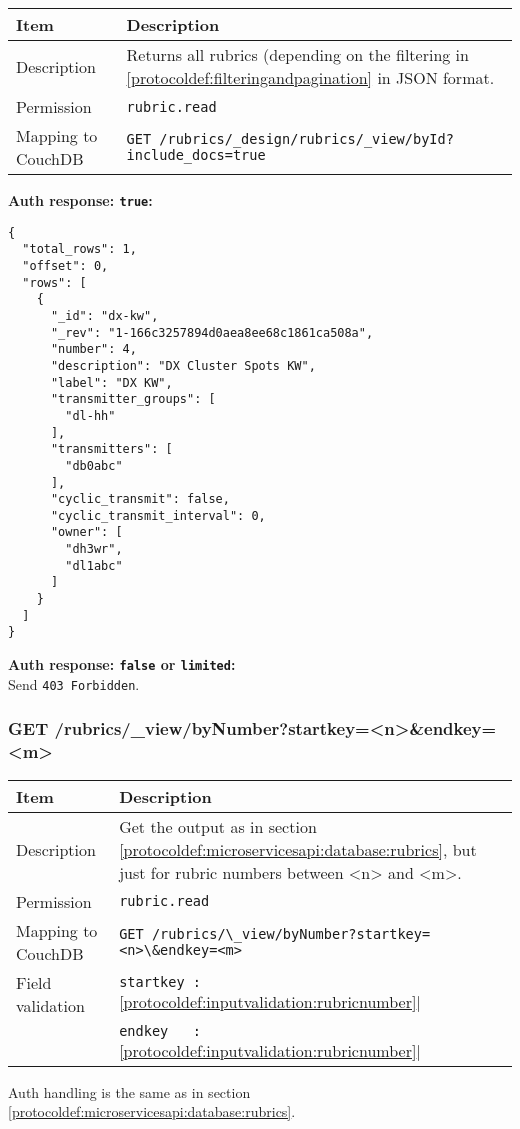 \begin{table}[htbp]
  \begin{tabular}{|l|p{12cm}|} \hline
    Item               & Description  \\ \hline \hline
    Description        & Returns all rubrics (depending on the filtering in \ref{protocoldef:filteringandpagination} in JSON format. \\ \hline
    Permission         & \verb|rubric.read| \\ \hline
    Mapping to CouchDB & \verb|GET /rubrics/_design/rubrics/_view/byId?include_docs=true|\\ \hline
  \end{tabular}
\end{table}

\textbf{Auth response: \texttt{true}:}\\
\begin{lstlisting}
{
  "total_rows": 1,
  "offset": 0,
  "rows": [
    {
      "_id": "dx-kw",
      "_rev": "1-166c3257894d0aea8ee68c1861ca508a",
      "number": 4,
      "description": "DX Cluster Spots KW",
      "label": "DX KW",
      "transmitter_groups": [
        "dl-hh"
      ],
      "transmitters": [
        "db0abc"
      ],
      "cyclic_transmit": false,
      "cyclic_transmit_interval": 0,
      "owner": [
        "dh3wr",
        "dl1abc"
      ]
    }
  ]
}
\end{lstlisting}

\textbf{Auth response: \texttt{false} or \texttt{limited}:}\\
Send \verb|403 Forbidden|.

\newpage
\subsubsection{GET /rubrics/\_view/byNumber?startkey=<n>\&endkey=<m>}
\begin{table}[htbp]
  \begin{tabular}{|l|p{12cm}|} \hline
    Item               & Description  \\ \hline \hline
    Description        & Get the output as in section \ref{protocoldef:microservicesapi:database:rubrics}, but just for rubric numbers between <n> and <m>. \\ \hline
    Permission         & \verb|rubric.read| \\ \hline
    Mapping to CouchDB & \verb|GET /rubrics/\_view/byNumber?startkey=<n>\&endkey=<m>| \\ \hline
    Field validation   & \verb|startkey :| \ref{protocoldef:inputvalidation:rubricnumber}| \\
                       & \verb|endkey   :| \ref{protocoldef:inputvalidation:rubricnumber}| \\ \hline
  \end{tabular}
\end{table}
Auth handling is the same as in section \ref{protocoldef:microservicesapi:database:rubrics}.


